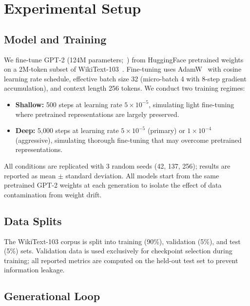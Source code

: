 \documentclass{article}
\begin{document}
\section{Experimental Setup}
\label{sec:method}

\subsection{Model and Training}

We fine-tune GPT-2 (124M parameters;~\citealt{radford2019language}) from HuggingFace pretrained weights on a 2M-token subset of WikiText-103~\citep{merity2017pointer}.
Fine-tuning uses AdamW~\citep{loshchilov2019decoupled} with cosine learning rate schedule, effective batch size 32 (micro-batch 4 with 8-step gradient accumulation), and context length 256 tokens.
We conduct two training regimes:

\begin{itemize}[leftmargin=*]
  \item \textbf{Shallow:} 500 steps at learning rate $5 \times 10^{-5}$, simulating light fine-tuning where pretrained representations are largely preserved.
  \item \textbf{Deep:} 5{,}000 steps at learning rate $5 \times 10^{-5}$ (primary) or $1 \times 10^{-4}$ (aggressive), simulating thorough fine-tuning that may overcome pretrained representations.
\end{itemize}

All conditions are replicated with 3 random seeds (42, 137, 256); results are reported as mean $\pm$ standard deviation.
All models start from the same pretrained GPT-2 weights at each generation to isolate the effect of data contamination from weight drift.

\subsection{Data Splits}

The WikiText-103 corpus is split into training (90\%), validation (5\%), and test (5\%) sets.
Validation data is used exclusively for checkpoint selection during training; all reported metrics are computed on the held-out test set to prevent information leakage.

\subsection{Generational Loop}
\end{document}
